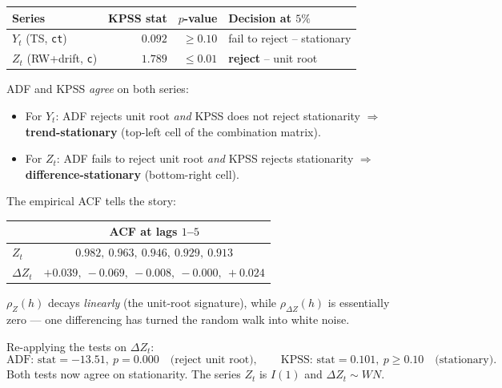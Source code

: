 \documentclass[a4paper,11pt]{article}
\begin{document}
\begin{exercise}\end{exercise}

\begin{solution}
\begin{center}
\begin{tabular}{lrrl}
\toprule
Series                             & KPSS stat & $p$-value & Decision at $5\%$ \\
\midrule
$Y_t$ (TS, \texttt{ct})            & $0.092$  & $\geq 0.10$ & fail to reject -- stationary \\
$Z_t$ (RW+drift, \texttt{c})       & $1.789$  & $\leq 0.01$ & \textbf{reject} -- unit root \\
\bottomrule
\end{tabular}
\end{center}

ADF and KPSS \emph{agree} on both series:
\begin{itemize}
  \item For $Y_t$: ADF rejects unit root \emph{and} KPSS does not
        reject stationarity $\Rightarrow$ \textbf{trend-stationary}
        (top-left cell of the combination matrix).
  \item For $Z_t$: ADF fails to reject unit root \emph{and} KPSS
        rejects stationarity $\Rightarrow$ \textbf{difference-stationary}
        (bottom-right cell).
\end{itemize}
\end{solution}

\begin{exercise}\end{exercise}

\begin{solution}
The empirical ACF tells the story:
\begin{center}
\begin{tabular}{lc}
\toprule
              & ACF at lags $1$--$5$ \\
\midrule
$Z_t$         & $0.982,\ 0.963,\ 0.946,\ 0.929,\ 0.913$ \\
$\Delta Z_t$  & $+0.039,\ -0.069,\ -0.008,\ -0.000,\ +0.024$ \\
\bottomrule
\end{tabular}
\end{center}
$\rho_Z(h)$ decays \emph{linearly} (the unit-root signature), while
$\rho_{\Delta Z}(h)$ is essentially zero --- one differencing has
turned the random walk into white noise.

Re-applying the tests on $\Delta Z_t$:
\[
  \text{ADF: stat}=-13.51,\ p=0.000\quad\text{(reject unit root)},
  \qquad
  \text{KPSS: stat}=0.101,\ p\geq 0.10\quad\text{(stationary)}.
\]
Both tests now agree on stationarity. The series $Z_t$ is
$I(1)$ and $\Delta Z_t \sim WN$.
\end{solution}
\end{document}
